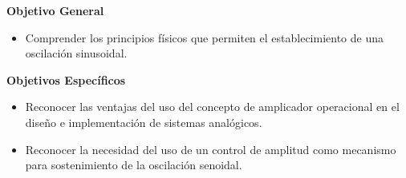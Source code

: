 \textbf{Objetivo General}

\begin{itemize}
    \item Comprender los principios físicos que permiten el establecimiento de una oscilación sinusoidal.
\end{itemize}

\textbf{Objetivos Específicos}

\begin{itemize}
    \item Reconocer las ventajas del uso del concepto de amplicador operacional en el diseño e implementación de sistemas analógicos.
    \item Reconocer la necesidad del uso de un control de amplitud
como mecanismo para sostenimiento de la oscilación senoidal.
\end{itemize}
